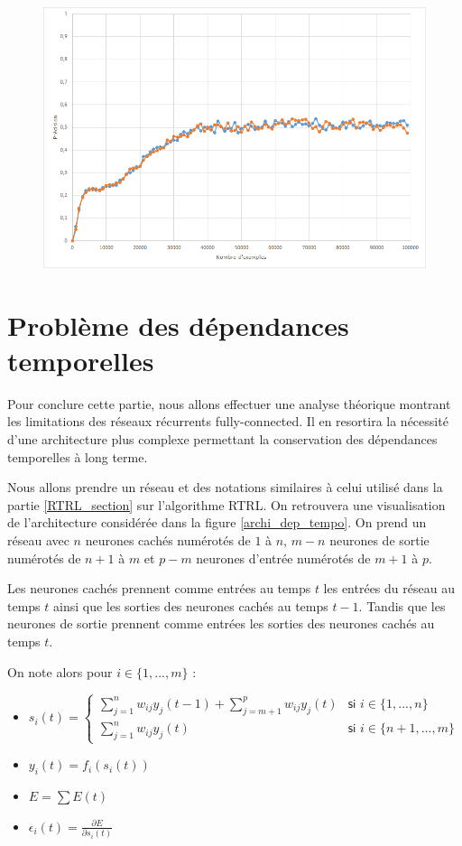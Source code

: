 \begin{figure}
\begin{center}
\includegraphics[scale=0.4]{images/chapter5/rtrl_bptt.png}
\end{center}
\end{figure}

\section{Problème des dépendances temporelles}

\label{dependances_temporelles}

Pour conclure cette partie, nous allons effectuer une analyse théorique montrant les limitations des réseaux récurrents fully-connected. Il en resortira la nécessité d'une architecture plus complexe permettant la conservation des dépendances temporelles à long terme.

Nous allons prendre un réseau et des notations similaires à celui utilisé dans la partie \ref{RTRL_section} sur l'algorithme RTRL. On retrouvera une visualisation de l'architecture considérée dans la figure \ref{archi_dep_tempo}. On prend un réseau avec $n$ neurones cachés numérotés de $1$ à $n$, $m - n$ neurones de sortie numérotés de $n+1$ à $m$ et $p - m$ neurones d'entrée numérotés de $m+1$ à $p$.

Les neurones cachés prennent comme entrées au temps $t$ les entrées du réseau au temps $t$ ainsi que les sorties des neurones cachés au temps $t-1$. Tandis que les neurones de sortie prennent comme entrées les sorties des neurones cachés au temps $t$.

On note alors pour $i \in \{1, ..., m\}$ :
\begin{itemize}
	\item $s_i(t) = \left\{
    \begin{array}{ll}
        \sum_{j = 1}^{n}{w_{ij}y_j(t-1)} + \sum_{j = m+1}^{p}{w_{ij}y_j(t)} & \textsf{si } i \in \{1, ..., n\} \\
        \sum_{j = 1}^{n}{w_{ij}y_j(t)} & \textsf{si } i \in \{n+1, ..., m\}
    \end{array}
\right.$
	\item $y_i(t) = f_i(s_i(t))$
	\item $E = \sum{E(t)}$
	\item $\epsilon_i(t) = \frac{\partial E}{\partial s_i(t)}$
\end{itemize}


